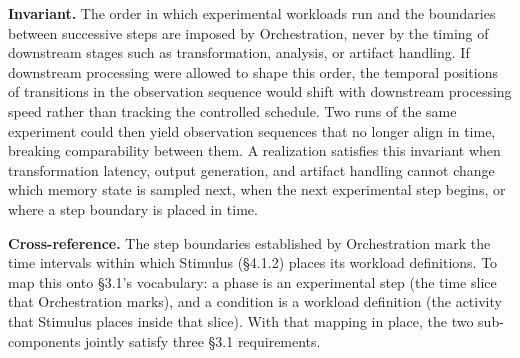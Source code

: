   \textbf{Invariant.} The order in which experimental workloads run and the boundaries between successive steps are imposed by Orchestration, never by the timing of downstream stages such as transformation, analysis, or artifact handling. If downstream processing were allowed to shape this order, the temporal positions of transitions in the observation sequence would shift with downstream processing speed rather than tracking the controlled schedule. Two runs of the same experiment could then yield observation sequences that no longer align in time, breaking comparability between them. A realization satisfies this invariant when transformation latency, output generation, and artifact handling cannot change which memory state is sampled next, when the next experimental step begins, or where a step boundary is placed in time.

  \textbf{Cross-reference.} The step boundaries established by Orchestration mark the time intervals within which Stimulus (\S4.1.2) places its workload definitions. To map this onto \S3.1's vocabulary: a phase is an experimental step (the time slice that Orchestration marks), and a condition is a workload definition (the activity that Stimulus places inside that slice). With that mapping in place, the two sub-components jointly satisfy three \S3.1 requirements.

